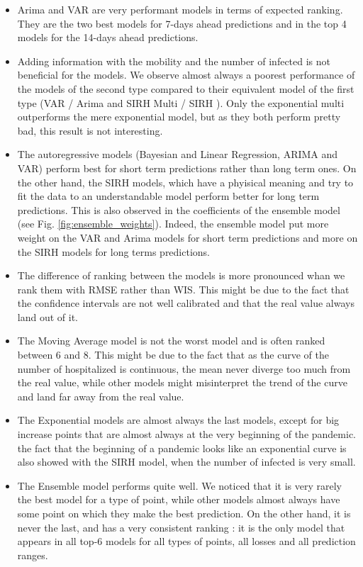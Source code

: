 \begin{itemize}
    \item Arima and VAR are very performant models in terms of expected ranking. They are the two best models for 7-days ahead predictions and in the top 4 models for the 14-days ahead predictions. 
    \item Adding information with the mobility and the number of infected is not beneficial for the models. We observe almost always a poorest performance of the models of the second type compared to their equivalent model of the first type (VAR / Arima and SIRH Multi / SIRH ). Only the exponential multi outperforms the mere exponential model, but as they both perform pretty bad, this result is not interesting. 
    \item The autoregressive models (Bayesian and Linear Regression, ARIMA and VAR) perform best for short term predictions rather than long term ones. On the other hand, the SIRH models, which have a phyisical meaning and try to fit the data to an understandable model perform better for long term predictions. This is also observed in the coefficients of the ensemble model (see Fig. \ref{fig:ensemble_weights}). Indeed, the ensemble model put more weight on the VAR and Arima models for short term predictions and more on the SIRH models for long terms predictions.  
    \item The difference of ranking between the models is more pronounced whan we rank them with RMSE rather than WIS. This might be due to the fact that the confidence intervals are not well calibrated and that the real value always land out of it. 
    \item The Moving Average model is not the worst model and is often ranked between 6 and 8. This might be due to the fact that as the curve of the number of hospitalized is continuous, the mean never diverge too much from the real value, while other models might misinterpret the trend of the curve and land far away from the real value. 
    \item The Exponential models are almost always the last models, except for big increase points that are almost always at the very beginning of the pandemic. the fact that the beginning of a pandemic looks like an exponential curve is also showed with the SIRH model, when the number of infected is very small. 
    \item The Ensemble model performs quite well. We noticed that it is very rarely the best model for a type of point, while other models almost always have some point on which they make the best prediction. On the other hand, it is never the last, and has a very consistent ranking : it is the only model that appears in all top-6 models for all types of points, all losses and all prediction ranges.
\end{itemize}





